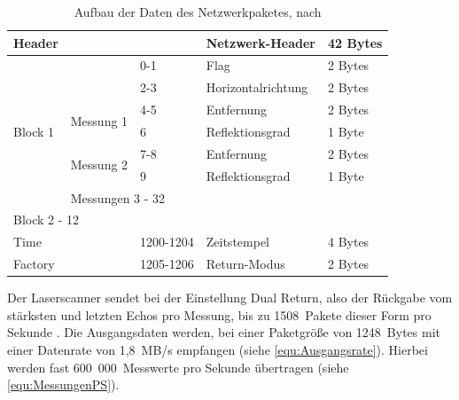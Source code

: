 \documentclass[a4paper,12pt,bibliography=totoc, listof=totoc,titlepage,pointlessnumbers]{scrreprt}
\begin{document}
\begin{table}
\centering
\begin{tabular}{|lll|l|l|}
\hline
Header                                         &                                 
                &           & Netzwerk-Header  & 42 Bytes \\ \hline
\multicolumn{1}{|l|}{\multirow{7}{*}{Block 1}} &                                 
                & 0-1       & Flag             & 2 Bytes  \\ \cline{2-5} 
\multicolumn{1}{|l|}{}                         &                                 
                & 2-3       & Horizontalrichtung & 2 Bytes  \\ \cline{2-5} 
\multicolumn{1}{|l|}{}                         & 
\multicolumn{1}{l|}{\multirow{2}{*}{Messung 1}} & 4-5       & Entfernung       & 
2 Bytes  \\ \cline{3-5} 
\multicolumn{1}{|l|}{}                         & \multicolumn{1}{l|}{}           
                & 6         & Reflektionsgrad    & 1 Byte   \\ \cline{2-5} 
\multicolumn{1}{|l|}{}                         & 
\multicolumn{1}{l|}{\multirow{2}{*}{Messung 2}} & 7-8       & Entfernung       & 
2 Bytes  \\ \cline{3-5} 
\multicolumn{1}{|l|}{}                         & \multicolumn{1}{l|}{}           
                & 9         & Reflektionsgrad     & 1 Byte   \\ \cline{2-5} 
\multicolumn{1}{|l|}{}                         & \multicolumn{4}{l|}{Messungen 3 
- 32}                                                     \\ \hline
\multicolumn{5}{|l|}{Block 2 - 12}                                               
                                                          \\ \hline
Time                                           & \multicolumn{1}{l|}{}           
                & 1200-1204 & Zeitstempel      & 4 Bytes  \\ \hline
Factory                                        & \multicolumn{1}{l|}{}           
                & 1205-1206 & Return-Modus     & 2 Bytes  \\ \hline
\end{tabular}

\caption{Aufbau der Daten des Netzwerkpaketes, nach \citet[S. 12]{vlpManual}}
\label{tab:datenmodell}
\end{table}

Der Laser\-scan\-ner sendet bei der Einstellung Dual Return, also der Rückgabe vom stärksten und letzten Echos pro Messung, 
bis zu 1508~Pakete dieser Form pro Sekunde \citep[S. 49]{vlpManual}. Die Ausgangsdaten werden, bei einer Paketgröße von 1248~Bytes mit einer Datenrate von 1,8~MB/s empfangen (siehe \autoref{equ:Ausgangsrate}). Hierbei werden fast 600~000~Messwerte pro Sekunde übertragen (siehe \autoref{equ:MessungenPS}).
\end{document}
